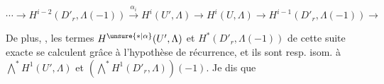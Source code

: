 \[
\cdots\longrightarrow H^{i-2}(D'_r,\Lambda(-1))\xrightarrow{\alpha_i}H^i(U',\Lambda)\longrightarrow H^i(U,\Lambda)\longrightarrow H^{i-1}(D'_r,\Lambda(-1))\longrightarrow
\tag*{(4.5.5)}
\]

De plus, , les termes $H^{\unsure{*|\alpha}}(U',\Lambda)$ et $H^*(D'_r,\Lambda(-1))$ de cette suite exacte se calculent grâce à l'hypothèse de récurrence, et ils sont resp. isom. à $\bigwedge^*H^1(U',\Lambda)$ et $(\bigwedge^*H^1(D'_r,\Lambda))(-1)$. Je dis que
